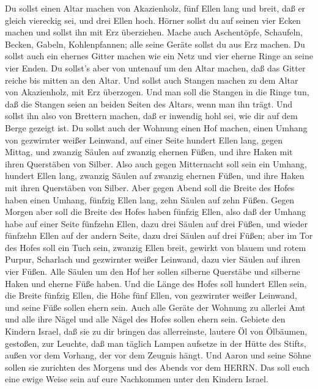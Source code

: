  Du sollst einen Altar machen von Akazienholz, fünf Ellen
lang und breit, daß er gleich viereckig sei, und drei Ellen hoch.
 Hörner sollst du auf seinen vier Ecken machen und sollst
ihn mit Erz überziehen.  Mache auch Aschentöpfe, Schaufeln,
Becken, Gabeln, Kohlenpfannen; alle seine Geräte sollst du aus Erz
machen.  Du sollst auch ein ehernes Gitter machen wie ein
Netz und vier eherne Ringe an seine vier Enden.  Du sollst's
aber von untenauf um den Altar machen, daß das Gitter reiche bis mitten
an den Altar.  Und sollst auch Stangen machen zu dem Altar
von Akazienholz, mit Erz überzogen.  Und man soll die
Stangen in die Ringe tun, daß die Stangen seien an beiden Seiten des
Altars, wenn man ihn trägt.  Und sollst ihn also von
Brettern machen, daß er inwendig hohl sei, wie dir auf dem Berge gezeigt
ist.  Du sollst auch der Wohnung einen Hof machen, einen
Umhang von gezwirnter weißer Leinwand, auf einer Seite hundert Ellen
lang, gegen Mittag,  und zwanzig Säulen auf zwanzig ehernen
Füßen, und ihre Haken mit ihren Querstäben von Silber. 
Also auch gegen Mitternacht soll sein ein Umhang, hundert Ellen lang,
zwanzig Säulen auf zwanzig ehernen Füßen, und ihre Haken mit ihren
Querstäben von Silber.  Aber gegen Abend soll die Breite
des Hofes haben einen Umhang, fünfzig Ellen lang, zehn Säulen auf zehn
Füßen.  Gegen Morgen aber soll die Breite des Hofes haben
fünfzig Ellen,  also daß der Umhang habe auf einer Seite
fünfzehn Ellen, dazu drei Säulen auf drei Füßen,  und
wieder fünfzehn Ellen auf der andern Seite, dazu drei Säulen auf drei
Füßen;  aber im Tor des Hofes soll ein Tuch sein, zwanzig
Ellen breit, gewirkt von blauem und rotem Purpur, Scharlach und
gezwirnter weißer Leinwand, dazu vier Säulen auf ihren vier Füßen.
 Alle Säulen um den Hof her sollen silberne Querstäbe und
silberne Haken und eherne Füße haben.  Und die Länge des
Hofes soll hundert Ellen sein, die Breite fünfzig Ellen, die Höhe fünf
Ellen, von gezwirnter weißer Leinwand, und seine Füße sollen ehern sein.
 Auch alle Geräte der Wohnung zu allerlei Amt und alle ihre
Nägel und alle Nägel des Hofes sollen ehern sein.  Gebiete
den Kindern Israel, daß sie zu dir bringen das allerreinste, lautere Öl
von Ölbäumen, gestoßen, zur Leuchte, daß man täglich Lampen aufsetze
 in der Hütte des Stifts, außen vor dem Vorhang, der vor
dem Zeugnis hängt. Und Aaron und seine Söhne sollen sie zurichten des
Morgens und des Abends vor dem HERRN. Das soll euch eine ewige Weise
sein auf eure Nachkommen unter den Kindern Israel.

